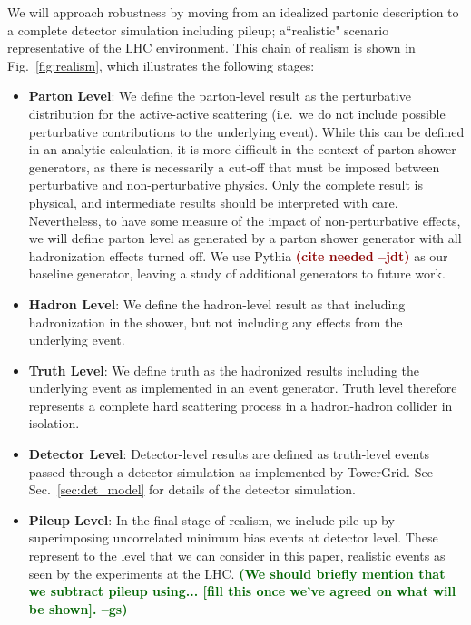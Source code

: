 \documentclass[11pt,letterpaper]{article}
\DeclareRobustCommand{\Sec}[1]{Sec.~\ref{#1}}
\DeclareRobustCommand{\Fig}[1]{Fig.~\ref{#1}}
\newcommand{\jdt}[1]{\textbf{\textcolor{darkred}{(#1 --jdt)}}}
\newcommand{\gs}[1]{\textbf{\textcolor{darkgreen}{(#1 --gs)}}}
\begin{document}
We will approach robustness by moving from an idealized partonic description to a complete detector simulation including pileup; a``realistic" scenario representative of the LHC environment.
%
This chain of realism is shown in \Fig{fig:realism}, which illustrates the following stages:
%
\begin{itemize}
\item {\bf Parton Level}: We define the parton-level result as the
  perturbative distribution for the active-active scattering (i.e.\ we
  do not include possible perturbative contributions to the underlying
  event).
  While this can be defined in an analytic calculation, it is
  more difficult in the context of parton shower generators, as
  there is necessarily a cut-off that must be imposed between
  perturbative and non-perturbative physics.
  Only the complete result
  is physical, and intermediate results should be interpreted with
  care.
  Nevertheless, to have some measure of the impact of
  non-perturbative effects, we will define parton level as generated
  by a parton shower generator with all hadronization effects turned
  off.
  We use Pythia \jdt{cite needed} as our baseline generator, leaving a study of additional generators to future work.
%
\item {\bf Hadron Level}: We define the hadron-level result as that including hadronization in the shower, but not including any effects from the underlying event.
%
\item {\bf Truth Level}:  We define truth as the hadronized results including the underlying event as implemented in an event generator.
%
Truth level therefore represents a complete hard scattering process in a hadron-hadron collider in isolation.
%
\item {\bf Detector Level}: Detector-level results are defined as truth-level events passed through a detector simulation as implemented by TowerGrid. See \Sec{sec:det_model} for details of the detector simulation.
%
\item {\bf Pileup Level}: In the final stage of realism, we include pile-up by superimposing uncorrelated minimum bias events at detector
  level.
  These represent to the level that we can consider in this
  paper, realistic events as seen by the experiments at the
  LHC.
  \gs{We should briefly mention that we subtract pileup
    using... [fill this once we've agreed on what will be shown].}
\end{itemize}
\end{document}
